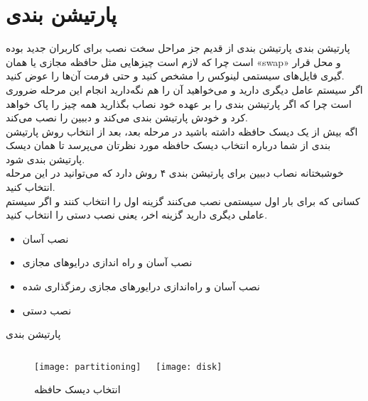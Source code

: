\section{پارتیشن بندی}
\begin{frame}{پارتیشن بندی}
  پارتیشن بندی از قدیم جز مراحل سخت نصب برای کاربران جدید بوده است چرا که لازم است چیزهایی مثل حافظه مجازی یا همان «swap» و محل قرار گیری فایل‌های سیستمی لینوکس را مشخص کنید و حتی فرمت آن‌ها را عوض کنید.\\
  اگر سیستم عامل دیگری دارید و می‌خواهید آن را هم نگه‌دارید انجام این مرحله ضروری است چرا که اگر پارتیشن بندی را بر عهده خود نصاب بگذارید همه چیز را پاک خواهد کرد و خودش پارتیشن بندی می‌کند و دببین را نصب می‌کند.\\
  اگه بیش از یک دیسک حافظه داشته باشید در مرحله بعد، بعد از انتخاب روش پارتیشن بندی از شما درباره انتخاب دیسک حافظه مورد نظرتان می‌پرسد تا همان دیسک پارتیشن بندی شود.\\
  خوشبختانه نصاب دببین برای پارتیشن بندی ۴ روش دارد که می‌توانید در این مرحله انتخاب کنید.\\
  کسانی که برای بار اول سیستمی نصب می‌کنند گزینه اول را انتخاب کنند و اگر سیستم عاملی دیگری دارید گزینه اخر، یعنی نصب دستی را انتخاب کنید.\\
  \begin{itemize}
    \item نصب آسان
    \item نصب آسان و راه اندازی درایوهای مجازی
    \item نصب آسان و راه‌اندازی درایورهای مجازی رمزگذاری شده
    \item نصب دستی
  \end{itemize}
\end{frame}

\begin{frame}{پارتیشن بندی}
    \begin{figure}
      \begin{columns}
        \texttt{[image: partitioning]}
        \caption{انتخاب روش پارتیشن بندی~\cite{fig:deb_partitioning,}}
        \texttt{[image: disk]}
        \caption{انتخاب دیسک حافظه~\cite{fig:deb_disk}}
      \end{columns}
    \end{figure}
\end{frame}

